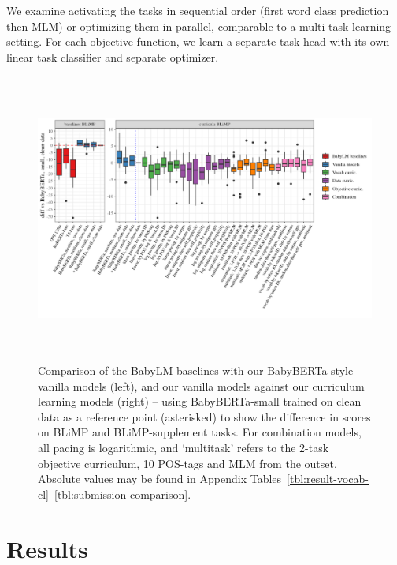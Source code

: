 We examine activating the tasks in sequential order (first word class prediction then MLM) or optimizing them in parallel, comparable to a multi-task learning setting. For each objective function, we learn a separate task head with its own linear task classifier and separate optimizer. 



\begin{figure}
\centering
\includegraphics[height=9.5cm]{chapters/climb/figures/babylm_blimp_diffs_boxplots.png}
\caption{\label{fig:blimp-boxplots} Comparison of the BabyLM baselines with our BabyBERTa-style vanilla models (left), and our vanilla models against our curriculum learning models (right) -- using BabyBERTa-small trained on clean data as a reference point (asterisked) to show the difference in scores on BLiMP and BLiMP-supplement tasks. For combination models, all pacing is logarithmic, and `multitask' refers to the 2-task objective curriculum, 10 POS-tags and MLM from the outset. Absolute values may be found in Appendix Tables~\ref{tbl:result-vocab-cl}--\ref{tbl:submission-comparison}.
}
\end{figure}


\section{Results}

